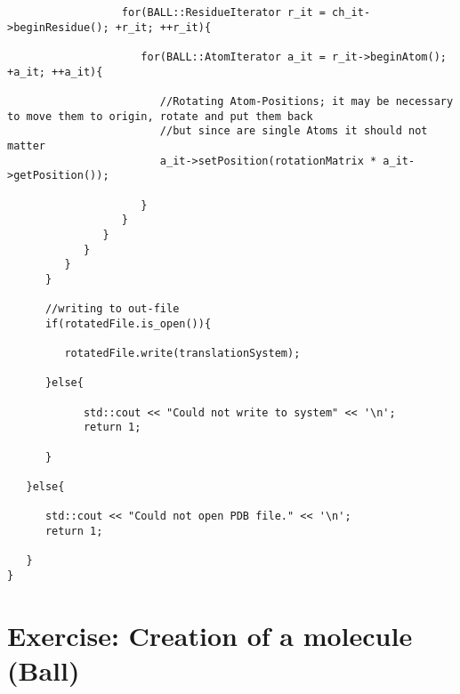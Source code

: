 \documentclass[11pt]{article}
\begin{document}
\begin{lstlisting}
                  for(BALL::ResidueIterator r_it = ch_it->beginResidue(); +r_it; ++r_it){

                     for(BALL::AtomIterator a_it = r_it->beginAtom(); +a_it; ++a_it){

                        //Rotating Atom-Positions; it may be necessary to move them to origin, rotate and put them back
                        //but since are single Atoms it should not matter
                        a_it->setPosition(rotationMatrix * a_it->getPosition());

                     }                   
                  }
               }
            }
         }
      }

      //writing to out-file
      if(rotatedFile.is_open()){

         rotatedFile.write(translationSystem);

      }else{

            std::cout << "Could not write to system" << '\n';
            return 1;

      }

   }else{

      std::cout << "Could not open PDB file." << '\n';
      return 1;

   }
}
\end{lstlisting}

\section{Exercise: Creation of a molecule (Ball)}
\end{document}

